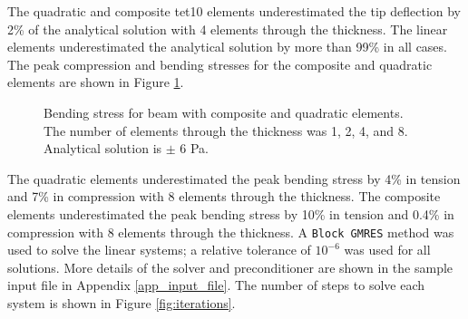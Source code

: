 \documentclass[a4paper, 12pt]{article}
\begin{document}
The quadratic and composite tet10 elements underestimated the tip deflection 
by 2\% of the analytical solution with 4 elements through
the thickness. 
The linear elements underestimated 
the analytical solution by more than 99\% in all cases.
The peak compression and bending stresses for
the composite and quadratic elements are shown in 
Figure \ref{fig:stresses}.

\begin{figure}[H]
  \centering
  \caption{Bending stress for beam with composite and quadratic elements.
           The number of elements through the thickness was 1, 2, 4, and 8.
           Analytical solution is $\pm$ 6 Pa.}
  \label{fig:stresses}
\end{figure}

The quadratic elements underestimated
the peak bending stress by 4\% in tension and 7\% in compression
with 8 elements through the thickness.
The composite elements underestimated
the peak bending stress by 10\% in tension and 0.4\% in compression
with 8 elements through the thickness.
A \texttt{Block GMRES} method was used to solve the linear systems;
a relative tolerance of $10^{-6}$ was used for all solutions.
More details of the solver and preconditioner are shown in 
the sample input file in Appendix \ref{app_input_file}.
The number of steps to solve each system is shown in 
Figure \ref{fig:iterations}.
\end{document}
